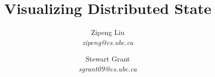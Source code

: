 \documentclass[10pt,twocolumn]{article}
\begin{document}
\title{Visualizing Distributed State}
\author{Zipeng Liu\\
    \textit{zipeng@cs.ubc.ca}
    \and
    Stewart Grant\\
    \textit{sgrant09@cs.ubc.ca}
}
\date{}
\maketitle
\thispagestyle{empty}











\balance


\end{document}
